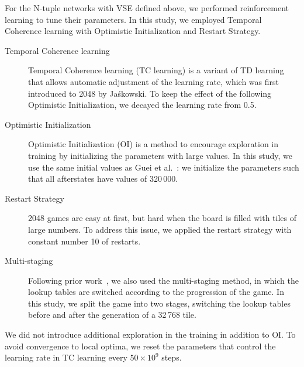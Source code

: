 
For the N-tuple networks with VSE defined above, we performed reinforcement learning to tune their parameters.
In this study, we employed Temporal Coherence learning with Optimistic Initialization and Restart Strategy.
\begin{description}
 \item[Temporal Coherence learning~] Temporal Coherence learning (TC learning) is a variant of TD learning that allows automatic adjustment of the learning rate, which was first introduced to 2048 by Ja\'skowski.  To keep the effect of the following Optimistic Initialization, we decayed the learning rate from 0.5.
 \item[Optimistic Initialization~] Optimistic Initialization (OI) is a method to encourage exploration in training by initializing the parameters with large values.  In this study, we use the same initial values as Guei et al.~\cite{GuCW22}: we initialize the parameters such that all afterstates have values of 320\,000.
 \item[Restart Strategy~] 2048 games are easy at first, but hard when the board is filled with tiles of large numbers.  To address this issue, we applied the restart strategy with constant number 10 of restarts.
 \item[Multi-staging~] Following prior work~\cite{GuCW22}, we also used the multi-staging method, in which the lookup tables are switched according to the progression of the game. In this study, we split the game into two stages, switching the lookup tables before and after the generation of a 32\,768 tile.
\end{description}
We did not introduce additional exploration in the training in addition to OI.
To avoid convergence to local optima, we reset the parameters that control the learning rate in TC learning every $50 \times 10^9$ steps.

